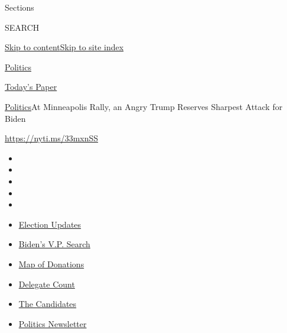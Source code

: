 Sections

SEARCH

\protect\hyperlink{site-content}{Skip to
content}\protect\hyperlink{site-index}{Skip to site index}

\href{https://www.nytimes.com/section/politics}{Politics}

\href{https://myaccount.nytimes.com/auth/login?response_type=cookie\&client_id=vi}{}

\href{https://www.nytimes.com/section/todayspaper}{Today's Paper}

\href{/section/politics}{Politics}\textbar{}At Minneapolis Rally, an
Angry Trump Reserves Sharpest Attack for Biden

\url{https://nyti.ms/33mxnSS}

\begin{itemize}
\item
\item
\item
\item
\item
\end{itemize}

\begin{itemize}
\item
  \href{https://www.nytimes.com/2020/07/31/us/elections/biden-vs-trump.html?action=click\&pgtype=Article\&state=default\&region=TOP_BANNER\&context=storylines_menu}{Election
  Updates}
\item
  \href{https://www.nytimes.com/article/biden-vice-president-2020.html?action=click\&pgtype=Article\&state=default\&region=TOP_BANNER\&context=storylines_menu}{Biden's
  V.P. Search}
\item
  \href{https://www.nytimes.com/interactive/2020/07/24/us/politics/trump-biden-campaign-donors.html?action=click\&pgtype=Article\&state=default\&region=TOP_BANNER\&context=storylines_menu}{Map
  of Donations}
\item
  \href{https://www.nytimes.com/interactive/2020/us/elections/delegate-count-primary-results.html?action=click\&pgtype=Article\&state=default\&region=TOP_BANNER\&context=storylines_menu}{Delegate
  Count}
\item
  \href{https://www.nytimes.com/interactive/2019/us/politics/2020-presidential-candidates.html?action=click\&pgtype=Article\&state=default\&region=TOP_BANNER\&context=storylines_menu}{The
  Candidates}
\item
  \href{https://www.nytimes.com/newsletters/politics?action=click\&pgtype=Article\&state=default\&region=TOP_BANNER\&context=storylines_menu}{Politics
  Newsletter}
\end{itemize}

